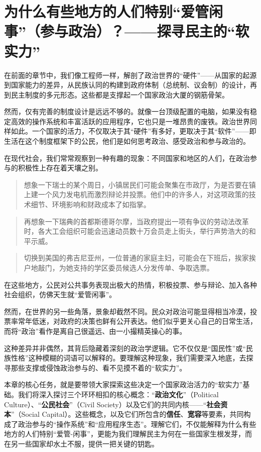 

\chapter{为什么有些地方的人们特别“爱管闲事”（参与政治）？——探寻民主的“软实力”}

在前面的章节中，我们像工程师一样，解剖了政治世界的“硬件”——从国家的起源到国家能力的差异，从民族认同的构建到政府体制（总统制、议会制）的设计，再到民主制度的多元形态。这些都是支撑起一个国家政治大厦的钢筋骨架。

然而，仅有完善的制度设计是远远不够的。就像一台顶级配置的电脑，如果没有稳定高效的操作系统和丰富活跃的应用程序，它也只是一堆昂贵的废铁。政治世界同样如此。一个国家的活力，不仅取决于其“硬件”有多好，更取决于其“软件”——即生活在这个制度框架下的公民，他们是如何思考政治、感受政治和参与政治的。

在现代社会，我们常常观察到一种有趣的现象：不同国家和地区的人们，在政治参与的积极性上存在着天壤之别。

\begin{quote}
想象一下瑞士的某个周日，小镇居民们可能会聚集在市政厅，为是否要在镇上建一个风力发电机而激烈辩论并投票。他们中的许多人，对这项政策的技术细节、环境影响和财政成本了如指掌。
\end{quote}

\begin{quote}
再想象一下瑞典的首都斯德哥尔摩，当政府提出一项有争议的劳动法改革时，各大工会组织可能会迅速动员数十万会员走上街头，举行声势浩大的和平示威。
\end{quote}

\begin{quote}
切换到美国的弗吉尼亚州，一位普通的家庭主妇，可能会在下班后，挨家挨户地敲门，为她支持的学区委员候选人分发传单、争取选票。
\end{quote}

在这些地方，公民对公共事务表现出极大的热情，积极投票、参与辩论、加入各种社会组织，仿佛天生就“爱管闲事”。

然而，在世界的另一些角落，景象却截然不同。民众对政治可能显得相当冷漠，投票率常年低迷，对政府的决策也鲜有公开表达。他们似乎更关心自己的日常生活，而将“政治”看作是离自己很遥远、由一小撮精英操心的事。

这种差异并非偶然，其背后隐藏着深刻的政治学逻辑。它不仅仅是“国民性”或“民族性格”这种模糊的词语可以解释的。要理解这种现象，我们需要深入地底，去探寻那些支撑或侵蚀政治参与的、看不见摸不着的“软实力”。

本章的核心任务，就是要带领大家探索这些决定一个国家政治活力的“软实力”基础。我们将深入探讨三个环环相扣的核心概念：“\textbf{政治文化}”（Political Culture）、“\textbf{公民社会}”（Civil Society）以及它们的共同内核——“\textbf{社会资本}”（Social Capital）。这些概念，以及它们所包含的\textbf{信任}、\textbf{宽容}等要素，共同构成了政治参与的“操作系统”和“应用程序生态”。理解它们，不仅能解释为什么有些地方的人们特别“爱管-闲事”，更能为我们理解民主为何在一些国家生根发芽，而在另一些国家却水土不服，提供一把关键的钥匙。

